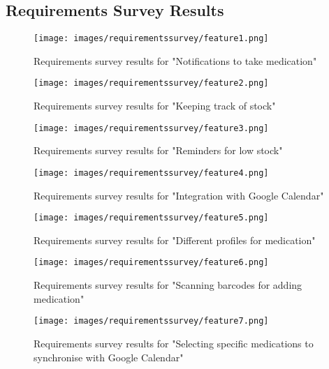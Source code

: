 \documentclass{l4proj}
\begin{document}
\begin{appendices}

\chapter{Requirements Survey Results}

\begin{figure}[!ht]
    \centering
    \texttt{[image: images/requirementssurvey/feature1.png]}
    \caption{Requirements survey results for "Notifications to take medication"}
    \label{fig:req1results}
\end{figure}

\begin{figure}
    \centering
    \texttt{[image: images/requirementssurvey/feature2.png]}
    \caption{Requirements survey results for "Keeping track of stock"}
    \label{fig:req2results}
\end{figure}

\begin{figure}
    \centering
    \texttt{[image: images/requirementssurvey/feature3.png]}
    \caption{Requirements survey results for "Reminders for low stock"}
    \label{fig:req3results}
\end{figure}

\begin{figure}
    \centering
    \texttt{[image: images/requirementssurvey/feature4.png]}
    \caption{Requirements survey results for "Integration with Google Calendar"}
    \label{fig:req4results}
\end{figure}

\begin{figure}
    \centering
    \texttt{[image: images/requirementssurvey/feature5.png]}
    \caption{Requirements survey results for "Different profiles for medication"}
    \label{fig:req5results}
\end{figure}

\begin{figure}
    \centering
    \texttt{[image: images/requirementssurvey/feature6.png]}
    \caption{Requirements survey results for "Scanning barcodes for adding medication"}
    \label{fig:req6results}
\end{figure}

\begin{figure}
    \centering
    \texttt{[image: images/requirementssurvey/feature7.png]}
    \caption{Requirements survey results for "Selecting specific medications to synchronise with Google Calendar"}
    \label{fig:req7results}
\end{figure}


\end{appendices}
\end{document}
